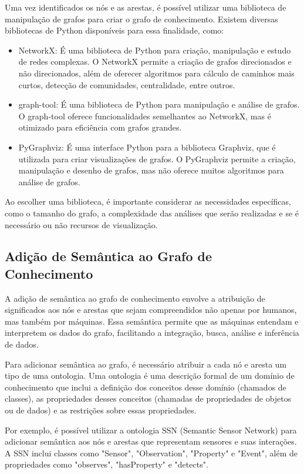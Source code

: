 Uma vez identificados os nós e as arestas, é possível utilizar uma biblioteca de manipulação de grafos para criar o grafo de conhecimento. Existem diversas bibliotecas de Python disponíveis para essa finalidade, como:

\begin{itemize}
    \item NetworkX: É uma biblioteca de Python para criação, manipulação e estudo de redes complexas. O NetworkX permite a criação de grafos direcionados e não direcionados, além de oferecer algoritmos para cálculo de caminhos mais curtos, detecção de comunidades, centralidade, entre outros.
    \item graph-tool: É uma biblioteca de Python para manipulação e análise de grafos. O graph-tool oferece funcionalidades semelhantes ao NetworkX, mas é otimizado para eficiência com grafos grandes.
    \item PyGraphviz: É uma interface Python para a biblioteca Graphviz, que é utilizada para criar visualizações de grafos. O PyGraphviz permite a criação, manipulação e desenho de grafos, mas não oferece muitos algoritmos para análise de grafos.
\end{itemize}

Ao escolher uma biblioteca, é importante considerar as necessidades específicas, como o tamanho do grafo, a complexidade das análises que serão realizadas e se é necessário ou não recursos de visualização.

\subsection{Adição de Semântica ao Grafo de Conhecimento}

A adição de semântica ao grafo de conhecimento envolve a atribuição de significados aos nós e arestas que sejam compreendidos não apenas por humanos, mas também por máquinas. Essa semântica permite que as máquinas entendam e interpretem os dados do grafo, facilitando a integração, busca, análise e inferência de dados.

Para adicionar semântica ao grafo, é necessário atribuir a cada nó e aresta um tipo de uma ontologia. Uma ontologia é uma descrição formal de um domínio de conhecimento que inclui a definição dos conceitos desse domínio (chamados de classes), as propriedades desses conceitos (chamadas de propriedades de objetos ou de dados) e as restrições sobre essas propriedades.

Por exemplo, é possível utilizar a ontologia SSN (Semantic Sensor Network) para adicionar semântica aos nós e arestas que representam sensores e suas interações. A SSN inclui classes como "Sensor", "Observation", "Property" e "Event", além de propriedades como "observes", "hasProperty" e "detects".

